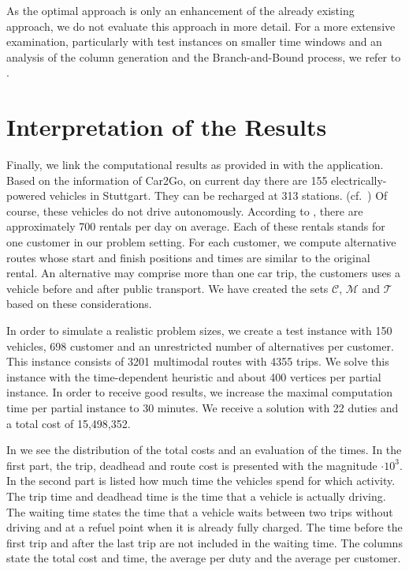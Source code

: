 As the optimal approach is only an enhancement of the already existing approach, we do not evaluate this approach in more detail. For a more extensive examination, particularly with test instances on smaller time windows and an analysis of the column generation and the Branch-and-Bound process, we refer to \cite[Sec.~10.2]{Kaiser}. 


\section{Interpretation of the Results}

Finally, we link the computational results as provided in  with the application. Based on the information of Car2Go, on current day there are 155 electrically-powered vehicles in Stuttgart. They can be recharged at 313 stations. (cf.~\cite[p.~144]{Kaiser}) Of course, these vehicles do not drive autonomously. According to , there are approximately 700 rentals per day on average. Each of these rentals stands for one customer in our problem setting. For each customer, we compute alternative routes whose start and finish positions and times are similar to the original rental. An alternative may comprise more than one car trip, \ie the customers uses a vehicle before and after public transport. We have created the sets $\mathcal{C}$, $\mathcal{M}$ and $\mathcal{T}$ based on these considerations.

In order to simulate a realistic problem sizes, we create a test instance with 150 vehicles, 698 customer and an unrestricted number of alternatives per customer. This instance consists of 3201 multimodal routes with 4355 trips. We solve this instance with the time-dependent heuristic and about 400 vertices per partial instance. In order to receive good results, we increase the maximal computation time per partial instance to 30 minutes. We receive a solution with 22 duties and a total cost of 15,498,352.

In  we see the distribution of the total costs and an evaluation of the times. In the first part, the trip, deadhead and route cost is presented with the magnitude ${\cdot 10^3}$. In the second part is listed how much time the vehicles spend for which activity. The trip time and deadhead time is the time that a vehicle is actually driving. The waiting time states the time that a vehicle waits between two trips without driving and at a refuel point when it is already fully charged. The time before the first trip and after the last trip are not included in the waiting time. The columns state the total cost and time, the average per duty and the average per customer. 

